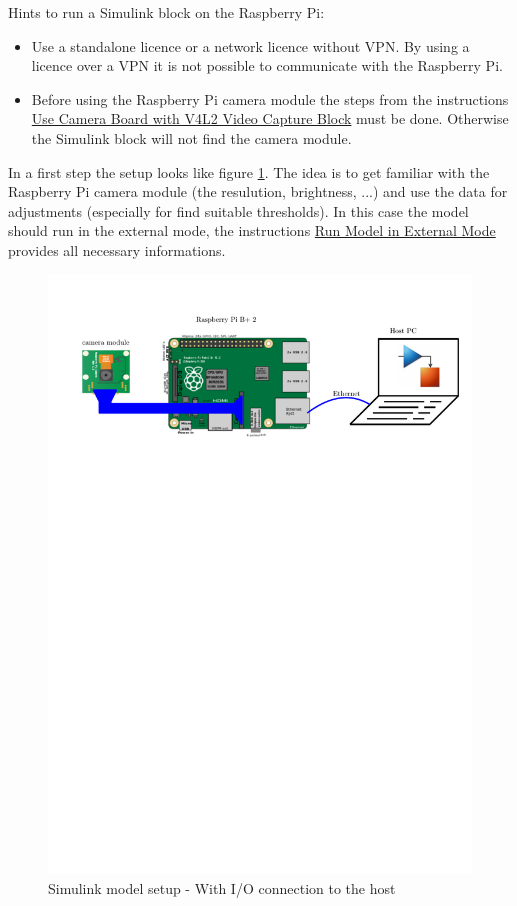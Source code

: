 \documentclass[Bachelorarbeit.tex]{subfiles}
\begin{document}
\medskip
Hints to run a Simulink block on the Raspberry Pi:
\begin{itemize}
\item Use a standalone licence or a network licence without VPN. By using a licence over a VPN it is not possible to communicate with the Raspberry Pi.
\item Before using the Raspberry Pi camera module the steps from the instructions \href{https://de.mathworks.com/help/supportpkg/raspberrypi/ug/add-support-for-raspberry-pi-camera-board.html}{Use Camera Board with V4L2 Video Capture Block} must be done. Otherwise the Simulink block will not find the camera module.
\end{itemize}


\medskip
In a first step the setup looks like figure \ref{SimModelWithIO}. The idea is to get familiar with the Raspberry Pi camera module (the resulution, brightness, ...) and use the data for adjustments (especially for find suitable thresholds). In this case the model should run in the external mode, the instructions \href{https://de.mathworks.com/help/supportpkg/rtlsdrradio/ug/run-model-in-external-mode.html}{Run Model in External Mode} provides all necessary informations.

\begin{figure}[!h]
\centering
\includegraphics[page=1,width=14cm]{./img/raspberryPi/setups.pdf} 
\caption{Simulink model setup - With I/O connection to the host}
\label{SimModelWithIO}
\end{figure}
\end{document}

